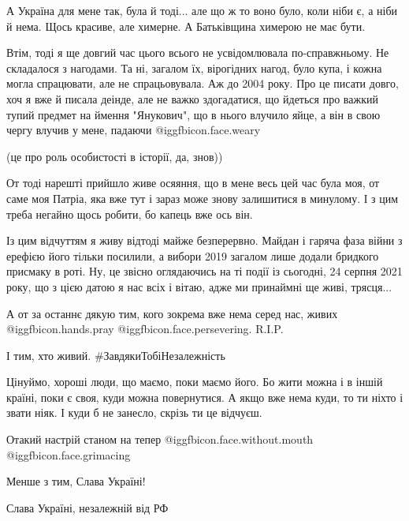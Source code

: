 А Україна для мене так, була й тоді... але що ж то воно було, коли ніби є, а
ніби й нема. Щось красиве, але химерне. А Батьківщина химерою не має бути.

Втім, тоді я ще довгий час цього всього не усвідомлювала по-справжньому. Не
складалося з нагодами. Та ні, загалом їх, вірогідних нагод, було купа, і кожна
могла спрацювати, але не спрацьовувала. Аж до 2004 року. Про це писати довго,
хоч я вже й писала деінде, але не важко здогадатися, що йдеться про важкий
тупий предмет на ймення "Янукович", що в нього влучило яйце, а він в свою чергу
влучив у мене, падаючи  @igg{fbicon.face.weary} 

(це про роль особистості в історії, да, знов))

От тоді нарешті прийшло живе осяяння, що в мене весь цей час була моя, от саме
моя Патріа, яка вже тут і зараз може знову залишитися в минулому. І з цим треба
негайно щось робити, бо капець вже ось він.

Із цим відчуттям я живу відтоді майже безперервно. Майдан і гаряча фаза війни з
ерефією його тільки посилили, а вибори 2019 загалом лише додали бридкого
присмаку в роті. Ну, це звісно оглядаючись на ті події із сьогодні, 24 серпня
2021 року, що з цією датою я нас всіх і вітаю, адже ми принаймні ще живі,
трясця...

А от за останнє дякую тим, кого зокрема вже нема серед нас, живих
@igg{fbicon.hands.pray}   @igg{fbicon.face.persevering}. R.I.P.

І тим, хто живий. \#ЗавдякиТобіНезалежність

Цінуймо, хороші люди, що маємо, поки маємо його. Бо жити можна і в іншій
країні, поки є своя, куди можна повернутися. А якщо вже нема куди, то ти ніхто
і звати ніяк. І куди б не занесло, скрізь ти це відчуєш.

Отакий настрій станом на тепер  @igg{fbicon.face.without.mouth}  @igg{fbicon.face.grimacing} 

Менше з тим, Слава Україні!

 
Слава Україні, незалежній від РФ
